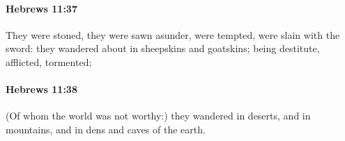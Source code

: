 		\paragraph{Hebrews 11:37} %
			\label{HEBREWS-11-37}

			They were stoned, they were sawn asunder, were tempted, were slain with the sword: they wandered about in sheepskins and goatskins; being destitute, afflicted, tormented;

			\begin{framed}
			\scriptsize
				\begin{compactdesc}
					\item[SBLG] 
				\end{compactdesc}
			\end{framed}

		\paragraph{Hebrews 11:38} %
			\label{HEBREWS-11-38}

			(Of whom the world was not worthy:) they wandered in deserts, and in mountains, and in dens and caves of the earth.

